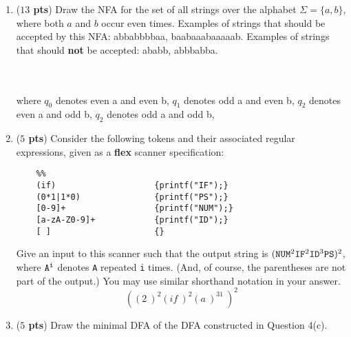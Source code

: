 \documentclass[10pt]{article}
\newcommand {\pts}[1]{({\bf #1 pts})}
\begin{document}
\begin{enumerate}
   \newpage
  \item \pts{$13$} Draw the NFA for the set of all strings over the alphabet $\Sigma = \{a,b\}$, where both $a$ and $b$ occur even times.
Examples of strings that should be accepted by this NFA: abbabbbbaa, baabaaabaaaaab.
Examples of strings that should \textbf{not} be accepted: ababb, abbbabba.
    \\
    \\
    \\
    where $q_0$ denotes even a and even b,
          $q_1$ denotes odd a and even b,
          $q_2$ denotes even a and odd b,
          $q_2$ denotes odd a and odd b,
  \newpage
   \item \pts{$5$} Consider the following tokens and their associated regular expressions, given as a \textbf{flex} scanner specification:

  \begin{lstlisting}
    %%
    (if)                    {printf("IF");}
    (0*1|1*0)               {printf("PS");}
    [0-9]+                  {printf("NUM");}
    [a-zA-Z0-9]+            {printf("ID");}
    [ ]                     {}
  \end{lstlisting}

  Give an input to this scanner such that the output string is $\tt (NUM^{\rm 2} IF^{\rm 2} ID^{\rm 3} PS)^{\rm 2}$, where $\tt A^i$ denotes {\tt A} repeated {\tt i} times.   (And, of course, the parentheses are not part of the output.)  You may use similar shorthand notation in your answer.
  \[
      ((2\ )^2(if\ )^2(a\ )^31\ )^2
  \]

  \newpage
  \item \pts{$5$} Draw the minimal DFA of the DFA constructed in Question 4(c).
   \\
    \\
\end{enumerate}
\end{document}
